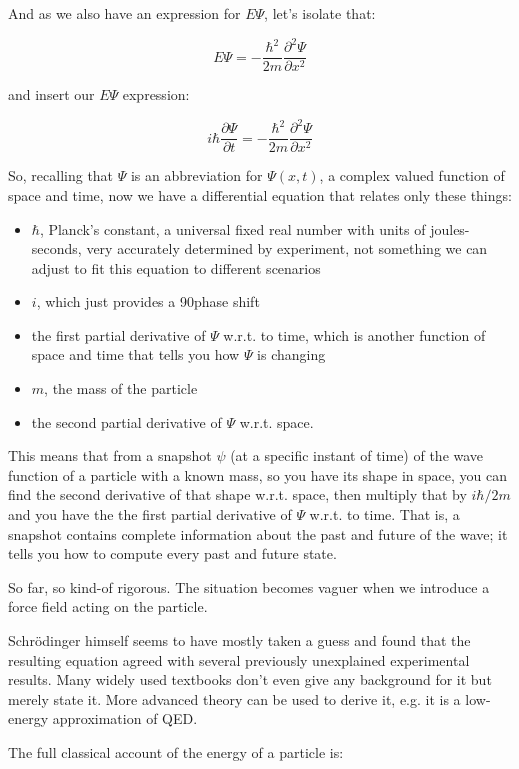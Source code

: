 And as we also have an expression for $E\Psi$, let's isolate that:

$$
E\Psi =
- \frac{\hbar^2}{2m} \frac{\partial^2 \Psi}{\partial x^2}
$$

and insert our $E\Psi$ expression:

$$
i\hbar \frac{\partial \Psi}{\partial t}
=
- \frac{\hbar^2}{2m} \frac{\partial^2 \Psi}{\partial x^2}
$$

So, recalling that $\Psi$ is an abbreviation for $\Psi(x, t)$, a complex valued function of space and time, now we have a differential equation that relates only these things:

\begin{itemize}
  \item $\hbar$, Planck's constant, a universal fixed real number with units of joules-seconds, very accurately determined by experiment, not something we can adjust to fit this equation to different scenarios
  \item $i$, which just provides a 90\textdegree phase shift
  \item the first partial derivative of $\Psi$ w.r.t. to time, which is another function of space and time that tells you how $\Psi$ is changing
  \item $m$, the mass of the particle
  \item the second partial derivative of $\Psi$ w.r.t. space.
\end{itemize}

This means that from a snapshot $\psi$ (at a specific instant of time) of the wave function of a particle with a known mass, so you have its shape in space, you can find the second derivative of that shape w.r.t. space, then multiply that by $i\hbar/2m$ and you have the the first partial derivative of $\Psi$ w.r.t. to time. That is, a snapshot contains complete information about the past and future of the wave; it tells you how to compute every past and future state.

So far, so kind-of rigorous. The situation becomes vaguer when we introduce a force field acting on the particle.

Schrödinger himself seems to have mostly taken a guess and found that the resulting equation agreed with several previously unexplained experimental results. Many widely used textbooks don't even give any background for it but merely state it. More advanced theory can be used to derive it, e.g. it is a low-energy approximation of QED.

The full classical account of the energy of a particle is:

